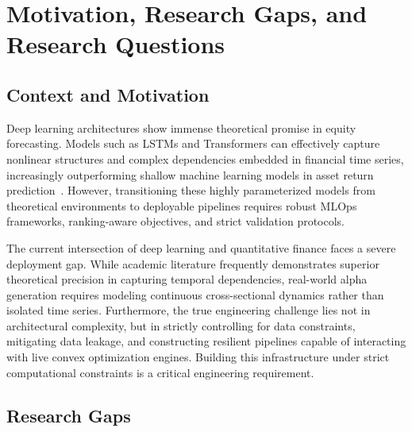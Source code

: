 \documentclass[twoside,final]{hcmut-report}
\begin{document}
\fancyfoot{}
\coverpage\clearpage

\tableofcontents\clearpage
\setcounter{page}{1}

\section{Motivation, Research Gaps, and Research Questions}

\subsection{Context and Motivation}

Deep learning architectures show immense theoretical promise in equity forecasting. Models such as LSTMs and Transformers can effectively capture nonlinear structures and complex dependencies embedded in financial time series, increasingly outperforming shallow machine learning models in asset return prediction~\cite{Ellery2025}. However, transitioning these highly parameterized models from theoretical environments to deployable pipelines requires robust MLOps frameworks, ranking-aware objectives, and strict validation protocols.

The current intersection of deep learning and quantitative finance faces a severe deployment gap. While academic literature frequently demonstrates superior theoretical precision in capturing temporal dependencies, real-world alpha generation requires modeling continuous cross-sectional dynamics rather than isolated time series. Furthermore, the true engineering challenge lies not in architectural complexity, but in strictly controlling for data constraints, mitigating data leakage, and constructing resilient pipelines capable of interacting with live convex optimization engines. Building this infrastructure under strict computational constraints is a critical engineering requirement.

\subsection{Research Gaps}
\end{document}
